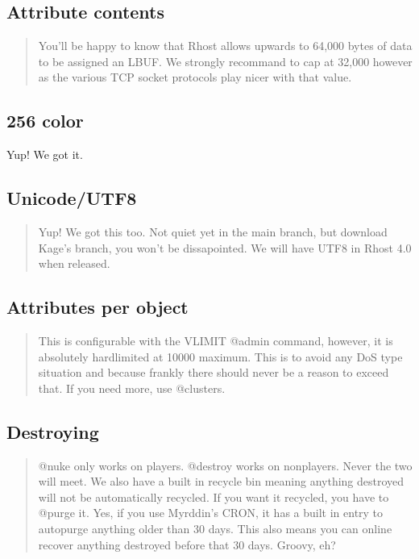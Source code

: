 \documentclass[letterpaper,10pt,english]{sphinxmanual}
\begin{document}
\subsection{Attribute contents}
\label{\detokenize{differences:attribute-contents}}\begin{quote}

\sphinxAtStartPar
You’ll be happy to know that Rhost allows upwards
to 64,000 bytes of data to be assigned an LBUF.  We strongly recommand
to cap at 32,000 however as the various TCP socket protocols play nicer
with that value.
\end{quote}


\subsection{256 color}
\label{\detokenize{differences:color}}
\sphinxAtStartPar
Yup!  We got it.


\subsection{Unicode/UTF8}
\label{\detokenize{differences:unicode-utf8}}\begin{quote}

\sphinxAtStartPar
Yup!  We got this too.  Not quiet yet in the main branch,
but download Kage’s branch, you won’t be dissapointed.  We will have
UTF8 in Rhost 4.0 when released.
\end{quote}


\subsection{Attributes per object}
\label{\detokenize{differences:attributes-per-object}}\begin{quote}

\sphinxAtStartPar
This is configurable with the VLIMIT @admin
command, however, it is absolutely hard\sphinxhyphen{}limited at 10000 maximum.
This is to avoid any DoS type situation and because frankly there
should never be a reason to exceed that.  If you need more, use
@clusters.
\end{quote}


\subsection{Destroying}
\label{\detokenize{differences:destroying}}\begin{quote}

\sphinxAtStartPar
@nuke only works on players.  @destroy works on non\sphinxhyphen{}players.
Never the two will meet.  We also have a built in recycle bin meaning
anything destroyed will not be automatically recycled.  If you want it
recycled, you have to @purge it.  Yes, if you use  Myrddin’s CRON, it
has a built in entry to auto\sphinxhyphen{}purge anything older than 30 days.  This
also means you can on\sphinxhyphen{}line recover anything destroyed before that 30
days.  Groovy, eh?
\end{quote}
\end{document}
